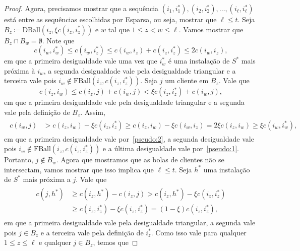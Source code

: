 \begin{proof}
    Agora, precisamos mostrar que a sequência $(i_1,i_1^*), (i_2,i_2^*), \ldots, (i_{\ell},i_{\ell}^*)$ está entre as sequências escolhidas por {\sc Esparsa}, ou seja, mostrar que $\ell \leq t$. Seja ${B_z \coloneqq \text{DBall}(i_z,\xi c(i_z,i_z^*))}$ e $w$ tal que $1 \leq z < w \leq \ell$. Vamos mostrar que $B_z \cap B_w = \emptyset$. 
    Note que 
    \begin{equation}
        c(i_w,i_w^*) \leq c(i_w,i_z^*) \leq c(i_w,i_z) + c(i_z,i_z^*) \leq 2 c(i_w,i_z), \label{pseudo:1}
    \end{equation}
    em que a primeira desigualdade vale uma vez que $i_w^*$ é uma instalação de $S^*$ mais próxima à $i_w$, a segunda desigualdade vale pela desigualdade triangular e a terceira vale pois $i_w \not \in \text{FBall}(i_z,c(i_z,i_z^*))$. Seja $j$ um cliente em $B_z$.
    Vale que
    \begin{equation}
        c(i_z,i_w) \leq c(i_z,j) + c(i_w,j) < \xi c(i_z,i_z^*) + c(i_w,j), \label{pseudo:2}
    \end{equation}
    em que a primeira desigualdade vale pela desigualdade triangular e a segunda vale pela definição de $B_z$.
    Assim,
        \begin{align}
            \begin{split}\nonumber
        c(i_w,j) &> c(i_z,i_w) - \xi c(i_z,i_z^*) 
        \geq c(i_z,i_w) - \xi c (i_w,i_z) 
        = 2\xi c(i_z,i_w) \geq \xi c(i_w,i_w^*),
            \end{split}
        \end{align}
    em que a primeira desigualdade vale por~\eqref{pseudo:2}, a segunda desigualdade vale pois ${i_w \not \in \text{FBall}(i_z,c(i_z,i_z^*))}$ e a última desigualdade vale por~\eqref{pseudo:1}.
    Portanto, $j \not \in B_w$. Agora que mostramos que as bolas de clientes não se intersectam, vamos mostrar que isso implica que $\ell \leq t$. Seja $h^*$ uma instalação de $S^*$ mais próxima a $j$. Vale que
        \begin{align}
            \begin{split} \nonumber
            c(j,h^*) &\geq c(i_z,h^*) - c(i_z,j) > c(i_z,h^*) - \xi c(i_z,i_z^*) \\
            &\geq c(i_z,i_z^*) - \xi c(i_z,i_z^*) = (1 - \xi) c(i_z,i_z^*),
            \end{split}
        \end{align}
    em que a primeira desigualdade vale pela desigualdade triangular, a segunda vale pois $j \in B_z$ e a terceira vale pela definição de $i_z^*$. Como isso vale para qualquer $1 \leq z\leq \ell$ e qualquer $j \in B_z$, temos que

\end{proof}
